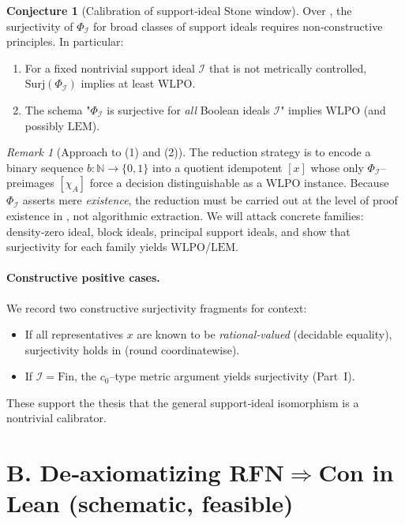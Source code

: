 \documentclass[11pt]{article}
\theoremstyle{definition}
\newtheorem{conjecture}[theorem]{Conjecture}
\theoremstyle{remark}
\newtheorem{remark}[theorem]{Remark}
\newcommand{\WLPO}{\mathrm{WLPO}}
\newcommand{\LEM}{\mathrm{LEM}}
\newcommand{\BISH}{\mathrm{BISH}}
\begin{document}
\begin{conjecture}[Calibration of support‑ideal Stone window]\label{VI:conj:stone-calibration}
Over \BISH, the surjectivity of $\Phi_{\mathcal I}$ for broad classes of support ideals requires non‑constructive principles. In particular:
\begin{enumerate}
\item For a fixed nontrivial support ideal $\mathcal I$ that is not metrically controlled, \(\mathrm{Surj}(\Phi_{\mathcal I})\) implies at least \(\WLPO\).
\item The schema "$\Phi_{\mathcal I}$ is surjective for \emph{all} Boolean ideals $\mathcal I$" implies \(\WLPO\) (and possibly \(\LEM\)).
\end{enumerate}
\end{conjecture}

\begin{remark}[Approach to (1) and (2)]
The reduction strategy is to encode a binary sequence $b:\mathbb N\to\{0,1\}$ into a quotient idempotent $[x]$ whose only $\Phi_{\mathcal I}$–preimages $[\chi_A]$ force a decision distinguishable as a \(\WLPO\) instance. Because \(\Phi_{\mathcal I}\) asserts mere \emph{existence}, the reduction must be carried out at the level of proof existence in \BISH, not algorithmic extraction. We will attack concrete families: density‑zero ideal, block ideals, principal support ideals, and show that surjectivity for each family yields \(\WLPO\)/\(\LEM\).
\end{remark}

\paragraph{Constructive positive cases.}
We record two constructive surjectivity fragments for context:
\begin{itemize}
\item If all representatives $x$ are known to be \emph{rational‑valued} (decidable equality), surjectivity holds in \BISH (round coordinatewise).
\item If $\mathcal I=\mathrm{Fin}$, the $c_0$–type metric argument yields surjectivity (Part~I).
\end{itemize}
These support the thesis that the general support‑ideal isomorphism is a nontrivial calibrator.

\section{B. De‑axiomatizing RFN\texorpdfstring{$\Rightarrow$}{=>}Con in Lean (schematic, feasible)}
\end{document}
